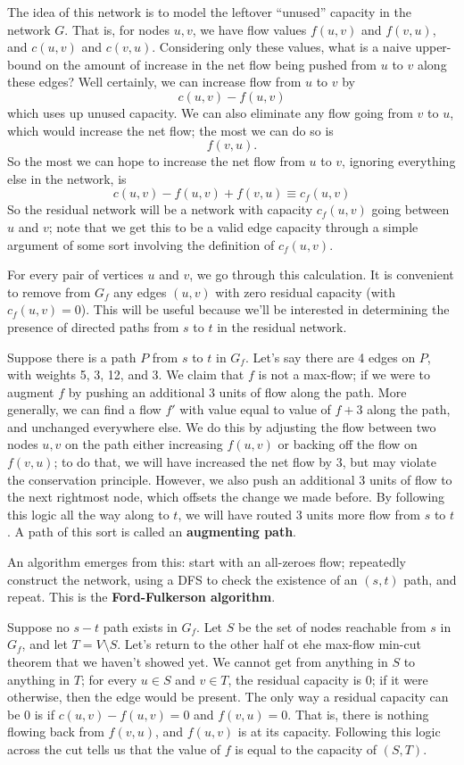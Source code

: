 \documentclass{article}
\begin{document}
The idea of this network is to model the leftover ``unused'' capacity in the
network $G$.
That is, for nodes $u,v$, we have flow values $f(u,v)$
and $f(v,u)$, and $c(u,v)$ and $c(v,u)$. Considering only these values, what
is a naive upper-bound on the amount of increase in the net flow being pushed
from $u$ to $v$ along these edges?
Well certainly, we can increase flow from $u$ to $v$ by
$$
c(u,v) - f(u,v)
$$
which uses up unused capacity.
We can also eliminate any flow going from $v$ to $u$, which would
increase the net flow; the most we can do so is
$$
f(v,u).
$$
So the most we can hope to increase the net flow from $u$ to $v$, ignoring
everything else in the network, is
$$
c(u,v) - f(u,v) + f(v,u)
\equiv c_f(u,v)
$$
So the residual network will be a network with capacity $c_f(u,v)$ going
between $u$ and $v$; note that we get this to be a valid edge capacity
through a simple argument of some sort involving the definition of $c_f(u,v)$.

For every pair of vertices $u$ and $v$, we go through this calculation.
It is convenient to remove from $G_f$ any edges $(u,v)$ with zero
residual capacity (with $c_f(u,v) = 0$).
This will be useful because we'll be interested in determining the presence
of directed paths from $s$ to $t$ in the residual network.

Suppose there is a path $P$ from $s$ to $t$ in $G_f$.
Let's say there are 4 edges on $P$, with weights 5, 3, 12, and 3.
We claim that $f$ is not a max-flow; if we were to augment $f$ by pushing
an additional 3 units of flow along the path.
More generally, we can find a flow $f'$ with value equal to value of $f + 3$
along the path, and unchanged everywhere else.
We do this by adjusting the flow between two nodes $u,v$ on the path either
increasing $f(u,v)$ or backing off the flow on $f(v,u)$; to do that, we
will have increased the net flow by $3$, but may violate the conservation
principle. However, we also push an additional 3 units of flow to the
next rightmost node, which offsets the change we made before.
By following this logic all the way along to $t$, we will have routed
3 units more flow from $s$ to $t$.
A path of this sort is called an \textbf{augmenting path}.

An algorithm emerges from this: start with an all-zeroes flow; repeatedly
construct the network, using a DFS to check the existence of an $(s,t)$ path, 
and repeat.
This is the \textbf{Ford-Fulkerson algorithm}.

Suppose no $s-t$ path exists in $G_f$.
Let $S$ be the set of nodes reachable from $s$ in $G_f$, and let 
$T = V\setminus S$.
Let's return to the other half ot ehe max-flow min-cut theorem that we haven't
showed yet.
We cannot get from anything in $S$ to anything in $T$; for every $u\in S$
and $v\in T$, the residual capacity is $0$; if it were otherwise, then the
edge would be present.
The only way a residual capacity can be $0$ is if $c(u,v) - f(u,v) = 0$ and $f(v,u) = 0$.
That is, there is nothing flowing back from $f(v,u)$, and $f(u,v)$ is at its
capacity.
Following this logic across the cut tells us that the value of $f$ is equal
to the capacity of $(S,T)$.
\end{document}
